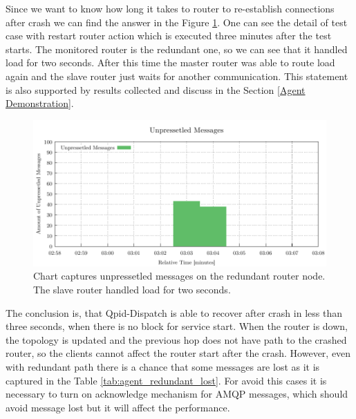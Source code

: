 Since we want to know how long it takes to router to re-establish connections after crash we can find the answer in the Figure \ref{fig:agent-redundant-unpressetled}. One can see the detail of test case with restart router action which is executed three minutes after the test starts. The monitored router is the redundant one, so we can see that it handled load for two seconds. After this time the master router was able to route load again and the slave router just waits for another communication. This statement is also supported by results collected and discuss in the Section \ref{Agent Demonstration}.

\begin{figure}[H]
	\centering
	\includegraphics[width=1\linewidth]{obrazky-figures/charts/restart-redundant-agent-routerLink.pdf}
	\caption{Chart captures unpressetled messages on the redundant router node. The slave router handled load for two seconds.}
	\label{fig:agent-redundant-unpressetled}
\end{figure}

The conclusion is, that Qpid-Dispatch is able to recover after crash in less than three seconds, when there is no block for service start. When the router is down, the topology is updated and the previous hop does not have path to the crashed router, so the clients cannot affect the router start after the crash. However, even with redundant path there is a chance that some messages are lost as it is captured in the Table \ref{tab:agent_redundant_lost}. For avoid this cases it is necessary to turn on acknowledge mechanism for AMQP messages, which should avoid message lost but it will affect the performance.

